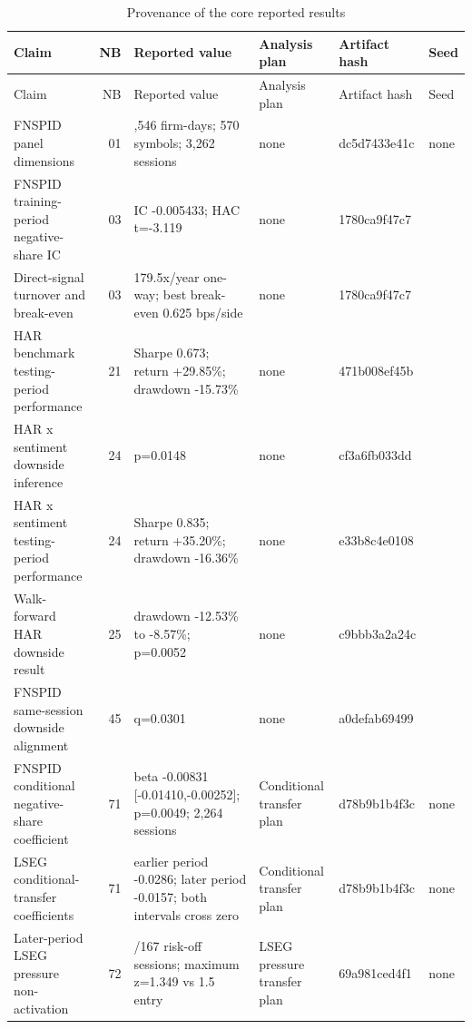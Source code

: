 \begingroup
\scriptsize
\setlength{\tabcolsep}{3pt}
\renewcommand{\arraystretch}{0.8}
\begin{longtable}{@{}>{\raggedright\arraybackslash}p{4.8cm} r >{\raggedright\arraybackslash}p{6.2cm} >{\raggedright\arraybackslash}p{5.2cm} l >{\raggedright\arraybackslash}p{2.4cm}@{}}
\caption{Provenance of the core reported results}
\label{tab:core-result-provenance} \\
\toprule
Claim & NB & Reported value & Analysis plan & Artifact hash & Seed \\
\midrule
\endfirsthead
\toprule
Claim & NB & Reported value & Analysis plan & Artifact hash & Seed \\
\midrule
\endhead
FNSPID panel dimensions & 01 & 715,546 firm-days; 570 symbols; 3,262 sessions & none & dc5d7433e41c & none \\
FNSPID training-period negative-share IC & 03 & IC -0.005433; HAC t=-3.119 & none & 1780ca9f47c7 & 20260731 \\
Direct-signal turnover and break-even & 03 & 179.5x/year one-way; best break-even 0.625 bps/side & none & 1780ca9f47c7 & 20260731 \\
HAR benchmark testing-period performance & 21 & Sharpe 0.673; return +29.85\%; drawdown -15.73\% & none & 471b008ef45b & 20260805 \\
HAR x sentiment downside inference & 24 & p=0.0148 & none & cf3a6fb033dd & 20260805 \\
HAR x sentiment testing-period performance & 24 & Sharpe 0.835; return +35.20\%; drawdown -16.36\% & none & e33b8c4e0108 & 20260805 \\
Walk-forward HAR downside result & 25 & drawdown -12.53\% to -8.57\%; p=0.0052 & none & c9bbb3a2a24c & 20260805 \\
FNSPID same-session downside alignment & 45 & q=0.0301 & none & a0defab69499 & 20260805 \\
FNSPID conditional negative-share coefficient & 71 & beta -0.00831 [-0.01410,-0.00252]; p=0.0049; 2,264 sessions & Conditional transfer plan & d78b9b1b4f3c & none \\
LSEG conditional-transfer coefficients & 71 & earlier period -0.0286; later period -0.0157; both intervals cross zero & Conditional transfer plan & d78b9b1b4f3c & none \\
Later-period LSEG pressure non-activation & 72 & 0/167 risk-off sessions; maximum z=1.349 vs 1.5 entry & LSEG pressure transfer plan & 69a981ced4f1 & none \\

\end{longtable}
